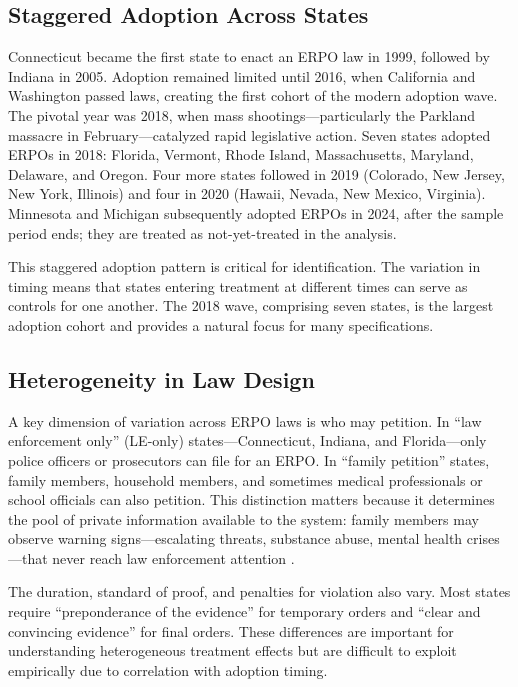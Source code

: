 \documentclass[12pt]{article}
\begin{document}
\subsection{Staggered Adoption Across States}

Connecticut became the first state to enact an ERPO law in 1999, followed by Indiana in 2005. Adoption remained limited until 2016, when California and Washington passed laws, creating the first cohort of the modern adoption wave. The pivotal year was 2018, when mass shootings---particularly the Parkland massacre in February---catalyzed rapid legislative action. Seven states adopted ERPOs in 2018: Florida, Vermont, Rhode Island, Massachusetts, Maryland, Delaware, and Oregon. Four more states followed in 2019 (Colorado, New Jersey, New York, Illinois) and four in 2020 (Hawaii, Nevada, New Mexico, Virginia). Minnesota and Michigan subsequently adopted ERPOs in 2024, after the sample period ends; they are treated as not-yet-treated in the analysis.

This staggered adoption pattern is critical for identification. The variation in timing means that states entering treatment at different times can serve as controls for one another. The 2018 wave, comprising seven states, is the largest adoption cohort and provides a natural focus for many specifications.

\subsection{Heterogeneity in Law Design}

A key dimension of variation across ERPO laws is who may petition. In ``law enforcement only'' (LE-only) states---Connecticut, Indiana, and Florida---only police officers or prosecutors can file for an ERPO. In ``family petition'' states, family members, household members, and sometimes medical professionals or school officials can also petition. This distinction matters because it determines the pool of private information available to the system: family members may observe warning signs---escalating threats, substance abuse, mental health crises---that never reach law enforcement attention \citep{wintemute2019extreme}.

The duration, standard of proof, and penalties for violation also vary. Most states require ``preponderance of the evidence'' for temporary orders and ``clear and convincing evidence'' for final orders. These differences are important for understanding heterogeneous treatment effects but are difficult to exploit empirically due to correlation with adoption timing.
\end{document}

